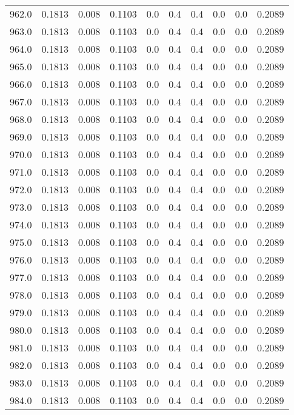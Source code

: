 \begin{longtable}{lrrrrrrrrr}
962.0 & 0.1813 & 0.008 & 0.1103 & 0.0 & 0.4 & 0.4 & 0.0 & 0.0 & 0.2089 \\
963.0 & 0.1813 & 0.008 & 0.1103 & 0.0 & 0.4 & 0.4 & 0.0 & 0.0 & 0.2089 \\
964.0 & 0.1813 & 0.008 & 0.1103 & 0.0 & 0.4 & 0.4 & 0.0 & 0.0 & 0.2089 \\
965.0 & 0.1813 & 0.008 & 0.1103 & 0.0 & 0.4 & 0.4 & 0.0 & 0.0 & 0.2089 \\
966.0 & 0.1813 & 0.008 & 0.1103 & 0.0 & 0.4 & 0.4 & 0.0 & 0.0 & 0.2089 \\
967.0 & 0.1813 & 0.008 & 0.1103 & 0.0 & 0.4 & 0.4 & 0.0 & 0.0 & 0.2089 \\
968.0 & 0.1813 & 0.008 & 0.1103 & 0.0 & 0.4 & 0.4 & 0.0 & 0.0 & 0.2089 \\
969.0 & 0.1813 & 0.008 & 0.1103 & 0.0 & 0.4 & 0.4 & 0.0 & 0.0 & 0.2089 \\
970.0 & 0.1813 & 0.008 & 0.1103 & 0.0 & 0.4 & 0.4 & 0.0 & 0.0 & 0.2089 \\
971.0 & 0.1813 & 0.008 & 0.1103 & 0.0 & 0.4 & 0.4 & 0.0 & 0.0 & 0.2089 \\
972.0 & 0.1813 & 0.008 & 0.1103 & 0.0 & 0.4 & 0.4 & 0.0 & 0.0 & 0.2089 \\
973.0 & 0.1813 & 0.008 & 0.1103 & 0.0 & 0.4 & 0.4 & 0.0 & 0.0 & 0.2089 \\
974.0 & 0.1813 & 0.008 & 0.1103 & 0.0 & 0.4 & 0.4 & 0.0 & 0.0 & 0.2089 \\
975.0 & 0.1813 & 0.008 & 0.1103 & 0.0 & 0.4 & 0.4 & 0.0 & 0.0 & 0.2089 \\
976.0 & 0.1813 & 0.008 & 0.1103 & 0.0 & 0.4 & 0.4 & 0.0 & 0.0 & 0.2089 \\
977.0 & 0.1813 & 0.008 & 0.1103 & 0.0 & 0.4 & 0.4 & 0.0 & 0.0 & 0.2089 \\
978.0 & 0.1813 & 0.008 & 0.1103 & 0.0 & 0.4 & 0.4 & 0.0 & 0.0 & 0.2089 \\
979.0 & 0.1813 & 0.008 & 0.1103 & 0.0 & 0.4 & 0.4 & 0.0 & 0.0 & 0.2089 \\
980.0 & 0.1813 & 0.008 & 0.1103 & 0.0 & 0.4 & 0.4 & 0.0 & 0.0 & 0.2089 \\
981.0 & 0.1813 & 0.008 & 0.1103 & 0.0 & 0.4 & 0.4 & 0.0 & 0.0 & 0.2089 \\
982.0 & 0.1813 & 0.008 & 0.1103 & 0.0 & 0.4 & 0.4 & 0.0 & 0.0 & 0.2089 \\
983.0 & 0.1813 & 0.008 & 0.1103 & 0.0 & 0.4 & 0.4 & 0.0 & 0.0 & 0.2089 \\
984.0 & 0.1813 & 0.008 & 0.1103 & 0.0 & 0.4 & 0.4 & 0.0 & 0.0 & 0.2089 \\

\end{longtable}
